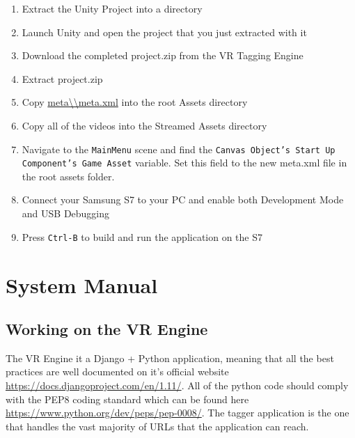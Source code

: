 \documentclass[12pt]{report}
\newcommand{\inlinecode}{\texttt}
\begin{document}
\begin{appendices}
 \begin{enumerate}
        \item Extract the Unity Project into a directory
        \item Launch Unity and open the project that you just extracted with it
        \item Download the completed project.zip from the VR Tagging Engine
        \item Extract project.zip
        \item Copy \url{meta\\meta.xml} into the root Assets directory
        \item Copy all of the videos into the Streamed Assets directory
        \item Navigate to the \inlinecode{MainMenu} scene and find the
            \inlinecode{Canvas Object's Start Up Component's Game Asset}
            variable. Set this field to the new meta.xml file in the root
            assets folder.
        \item Connect your Samsung S7 to your PC and enable both Development Mode and USB Debugging
        \item Press \inlinecode{Ctrl-B} to build and run the application on the S7
    \end{enumerate}

    \chapter{System Manual}
    \section{Working on the VR Engine}
    The VR Engine it a Django + Python application, meaning that all the best
    practices are well documented on it's official website
    \url{https://docs.djangoproject.com/en/1.11/}. All of the python code
    should comply with the PEP8 coding standard which can be found here
    \url{https://www.python.org/dev/peps/pep-0008/}. The tagger application is
    the one that handles the vast majority of URLs that the application can
    reach.


\end{appendices}
\end{document}
